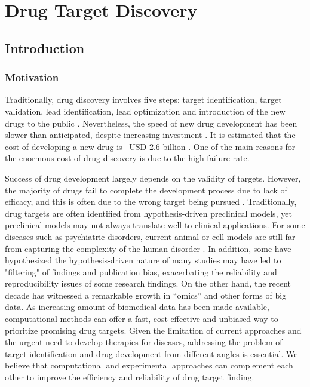 \chapter{Drug Target Discovery}

\section{Introduction}
  \subsection{Motivation}
    Traditionally, drug discovery involves five steps: target identification, target validation, lead identification, lead optimization and introduction of the new drugs to the public \cite{phoebe2008identifying}. Nevertheless, the speed of new drug development has been slower than anticipated, despite increasing investment \cite{pammolli2011productivity}. It is estimated that the cost of developing a new drug is ~USD 2.6 billion \cite{van1998socio}. One of the main reasons for the enormous cost of drug discovery is due to the high failure rate. 

    Success of drug development largely depends on the validity of targets. However, the majority of drugs fail to complete the development process due to lack of efficacy, and this is often due to the wrong target being pursued \cite{shih2018drug}. Traditionally, drug targets are often identified from hypothesis-driven preclinical models, yet preclinical models may not always translate well to clinical applications. For some diseases such as psychiatric disorders, current animal or cell models are still far from capturing the complexity of the human disorder \cite{nestler2010animal}. In addition, some have hypothesized the hypothesis-driven nature of many studies may have led to "filtering" of findings and publication bias, exacerbating the reliability and reproducibility issues of some research findings. On the other hand, the recent decade has witnessed a remarkable growth in “omics” and other forms of big data. As increasing amount of biomedical data has been made available, computational methods can offer a fast, cost-effective and unbiased way to prioritize promising drug targets. Given the limitation of current approaches and the urgent need to develop therapies for diseases, addressing the problem of target identification and drug development from different angles is essential. We believe that computational and experimental approaches can complement each other to improve the efficiency and reliability of drug target finding.  
  
